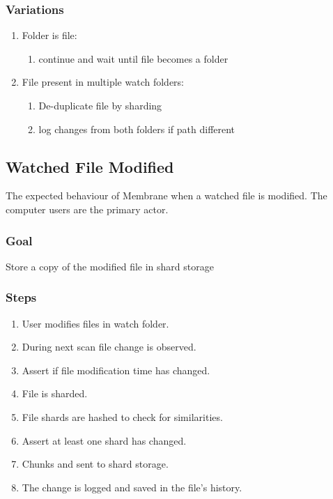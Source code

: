 \documentclass[11pt, a4paper, twocolumn, twoside]{report}
\begin{document}
\subsubsection{Variations}
\begin{enumerate}
  \item Folder is file:
	\begin{enumerate}
	  \item continue and wait until file becomes a folder
	\end{enumerate}
  \item File present in multiple watch folders:
	\begin{enumerate}
	  \item De-duplicate file by sharding
	  \item log changes from both folders if path different
	\end{enumerate}
\end{enumerate}

\subsection{Watched File Modified}
The expected behaviour of Membrane when a watched file is modified. The computer users are the primary actor.

\subsubsection{Goal}

Store a copy of the modified file in shard storage

\subsubsection{Steps}

\begin{enumerate}
 \item User modifies files in watch folder.
 \item During next scan file change is observed.
 \item Assert if file modification time has changed.
 \item File is sharded.
 \item File shards are hashed to check for similarities.
 \item Assert at least one shard has changed.
 \item Chunks and sent to shard storage.
 \item The change is logged and saved in the file's history.
\end{enumerate}
\end{document}
